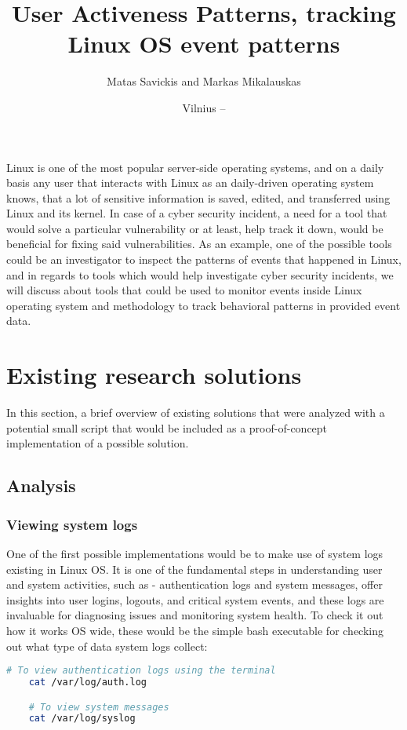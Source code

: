 \documentclass{VUMIFPSmagistrinis}
\title{User Activeness Patterns, tracking Linux OS event patterns}
\author{Matas Savickis and Markas Mikalauskas}
\date{Vilnius – \the\year}
\begin{document}

\maketitle
\tableofcontents

Linux is one of the most popular server-side operating systems, and on a daily basis any user that interacts with Linux as an daily-driven operating system knows, that a lot of sensitive information is saved, edited, and transferred using Linux and its kernel. In case of a cyber security incident, a need for a tool that would solve a particular vulnerability or at least, help track it down, would be beneficial for fixing said vulnerabilities. As an example, one of the possible tools could be an investigator to inspect the patterns of events that happened in Linux, and in regards to tools which would help investigate cyber security incidents, we will discuss about tools that could be used to monitor events inside Linux operating system and methodology to track behavioral patterns in provided event data.

\section{Existing research solutions}
In this section, a brief overview of existing solutions that were analyzed with a potential small script that would be included as a proof-of-concept implementation of a possible solution. 

\subsection{Analysis}
\subsubsection{Viewing system logs}
One of the first possible implementations would be to make use of system logs existing in Linux OS. It is one of the fundamental steps in understanding user and system activities, such as - authentication logs and system messages, offer insights into user logins, logouts, and critical system events, and these logs are invaluable for diagnosing issues and monitoring system health. To check it out how it works OS wide, these would be the simple bash executable for checking out what type of data system logs collect:

\begin{lstlisting}[language=bash]
    # To view authentication logs using the terminal
    cat /var/log/auth.log 

    # To view system messages
    cat /var/log/syslog
\end{lstlisting}
\end{document}
